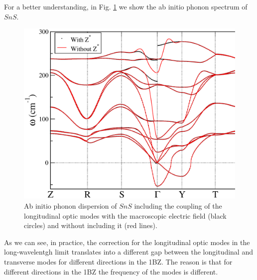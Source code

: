 For a better understanding, in Fig. \ref{LOTOsplitting} we show the ab initio phonon spectrum of $SnS$.
\begin{figure}[h]
\begin{center}
\includegraphics[width=0.8\linewidth]{Figures/charges.eps}
\caption[$SnS$ phonon spectrum with efective charges]{Ab initio phonon dispersion of $SnS$ including the coupling of the longitudinal optic modes with the macroscopic electric field (black circles) and without 
including it (red lines).}
\label{LOTOsplitting}
\end{center}
\end{figure}
As we can see, in practice, the correction for the longitudinal optic modes in the long-wavelentgh limit translates into a different gap between the longitudinal and transverse modes for different directions in the 1BZ. The reason 
is that for different directions in the 1BZ the frequency of the modes is different.

